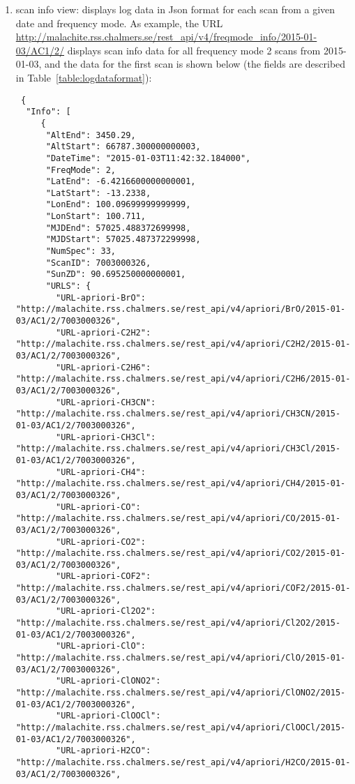 \begin{enumerate}
\item scan info view: displays log data in Json format for each scan from a given date and frequency mode. 
  As example, the URL \url{http://malachite.rss.chalmers.se/rest_api/v4/freqmode_info/2015-01-03/AC1/2/}
  displays scan info data for all frequency mode 2 scans from 2015-01-03, 
  and the data for the first scan is shown below (the fields are 
   described in Table~\ref{table:logdataformat}):
\begin{tiny}
 \begin{verbatim}
 {
  "Info": [
     {
      "AltEnd": 3450.29, 
      "AltStart": 66787.300000000003, 
      "DateTime": "2015-01-03T11:42:32.184000", 
      "FreqMode": 2, 
      "LatEnd": -6.4216600000000001, 
      "LatStart": -13.2338, 
      "LonEnd": 100.09699999999999, 
      "LonStart": 100.711, 
      "MJDEnd": 57025.488372699998, 
      "MJDStart": 57025.487372299998, 
      "NumSpec": 33, 
      "ScanID": 7003000326, 
      "SunZD": 90.695250000000001, 
      "URLS": {
        "URL-apriori-BrO": "http://malachite.rss.chalmers.se/rest_api/v4/apriori/BrO/2015-01-03/AC1/2/7003000326", 
        "URL-apriori-C2H2": "http://malachite.rss.chalmers.se/rest_api/v4/apriori/C2H2/2015-01-03/AC1/2/7003000326", 
        "URL-apriori-C2H6": "http://malachite.rss.chalmers.se/rest_api/v4/apriori/C2H6/2015-01-03/AC1/2/7003000326", 
        "URL-apriori-CH3CN": "http://malachite.rss.chalmers.se/rest_api/v4/apriori/CH3CN/2015-01-03/AC1/2/7003000326", 
        "URL-apriori-CH3Cl": "http://malachite.rss.chalmers.se/rest_api/v4/apriori/CH3Cl/2015-01-03/AC1/2/7003000326", 
        "URL-apriori-CH4": "http://malachite.rss.chalmers.se/rest_api/v4/apriori/CH4/2015-01-03/AC1/2/7003000326", 
        "URL-apriori-CO": "http://malachite.rss.chalmers.se/rest_api/v4/apriori/CO/2015-01-03/AC1/2/7003000326", 
        "URL-apriori-CO2": "http://malachite.rss.chalmers.se/rest_api/v4/apriori/CO2/2015-01-03/AC1/2/7003000326", 
        "URL-apriori-COF2": "http://malachite.rss.chalmers.se/rest_api/v4/apriori/COF2/2015-01-03/AC1/2/7003000326", 
        "URL-apriori-Cl2O2": "http://malachite.rss.chalmers.se/rest_api/v4/apriori/Cl2O2/2015-01-03/AC1/2/7003000326", 
        "URL-apriori-ClO": "http://malachite.rss.chalmers.se/rest_api/v4/apriori/ClO/2015-01-03/AC1/2/7003000326", 
        "URL-apriori-ClONO2": "http://malachite.rss.chalmers.se/rest_api/v4/apriori/ClONO2/2015-01-03/AC1/2/7003000326", 
        "URL-apriori-ClOOCl": "http://malachite.rss.chalmers.se/rest_api/v4/apriori/ClOOCl/2015-01-03/AC1/2/7003000326", 
        "URL-apriori-H2CO": "http://malachite.rss.chalmers.se/rest_api/v4/apriori/H2CO/2015-01-03/AC1/2/7003000326", 

\end{verbatim}
\end{tiny}
\end{enumerate}
